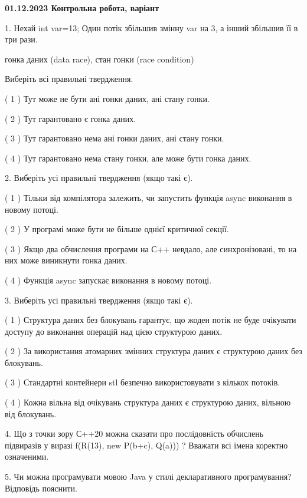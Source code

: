 \documentclass[12pt, ukrainian]{article}
\begin{document}
\vspace{4mm}
\newpage
\begin {large}

\textbf{01.12.2023 Контрольна робота, варіант  }\par


{
1. Нехай int var=13; Один потік збільшив змінну var на 3, а інший збільшив її в три рази.

гонка даних (data race), стан гонки (race condition)

Виберіть всі правильні твердження.\par
\vspace{2mm}
( 1 ) Тут може не бути ані гонки даних, ані стану гонки.%

( 2 ) Тут гарантовано є гонка даних.%

( 3 ) Тут гарантовано нема ані гонки даних, ані стану гонки.%

( 4 ) Тут гарантовано нема стану гонки, але може бути гонка даних.%


\vspace{5mm}
2. Виберіть усі правильні твердження (якщо такі є).\par
\vspace{2mm}

( 1 ) Тільки від компілятора залежить, чи запустить функція async виконання в новому потоці.%

( 2 ) У програмі може бути не більше однієї критичної секції.%

( 3 ) Якщо два обчислення програми на С++ невдало, але синхронізовані, то на них може виникнути гонка даних.%

( 4 ) Функція async запускає виконання в новому потоці.%


\vspace{5mm}
3. Виберіть усі правильні твердження (якщо такі є).\par
\vspace{2mm}

( 1 ) Структура даних без блокувань гарантує, що жоден потік не буде очікувати доступу до виконання операцій над цією структурою даних.%

( 2 ) За використання атомарних змінних структура даних є структурою даних без блокувань.%

( 3 ) Стандартні контейнери stl безпечно використовувати з кількох потоків.%

( 4 ) Кожна вільна від очікувань структура даних є структурою даних, вільною від блокувань.%


\vspace{5mm}
4. Що з точки зору С++20 можна сказати про послідовність обчислень підвиразів у виразі f(R(13), new P(b+c), Q(a))) ? Вважати всі імена коректно означеними.



\vspace{5mm}
5. Чи можна програмувати мовою Java у стилі декларативного програмування? Відповідь пояснити.
}
\end {large}
\end{document}
